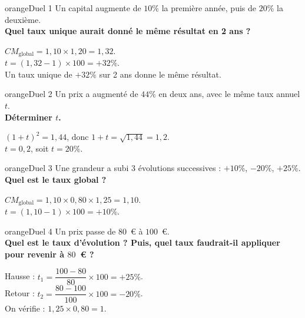 \documentclass[12pt,a4paper]{article}
\begin{document}
\vspace{0.3cm}

\begin{carte}{orange}{Duel 1}
Un capital augmente de \(10\%\) la première année, puis de \(20\%\) la deuxième.\\[0.2cm]
\textbf{Quel taux unique aurait donné le même résultat en 2 ans ?}
\end{carte}
\begin{corrige}
\(CM_{\text{global}} = 1{,}10 \times 1{,}20 = 1{,}32\).\\[0.2cm]
\(t = (1{,}32 - 1) \times 100 = +32\%\).\\[0.2cm]
Un taux unique de \(+32\%\) sur 2 ans donne le même résultat.
\end{corrige}

\begin{carte}{orange}{Duel 2}
Un prix a augmenté de \(44\%\) en deux ans, avec le même taux annuel \(t\).\\[0.2cm]
\textbf{Déterminer \(t\).}
\end{carte}
\begin{corrige}
\((1+t)^2 = 1{,}44\), donc \(1+t = \sqrt{1{,}44} = 1{,}2\).\\[0.2cm]
\(t = 0{,}2\), soit \(\boxed{t = 20\%}\).
\end{corrige}

\begin{carte}{orange}{Duel 3}
Une grandeur a subi 3 évolutions successives : \(+10\%\), \(-20\%\), \(+25\%\).\\[0.2cm]
\textbf{Quel est le taux global ?}
\end{carte}
\begin{corrige}
\(CM_{\text{global}} = 1{,}10 \times 0{,}80 \times 1{,}25 = 1{,}10\).\\[0.2cm]
\(t = (1{,}10 - 1) \times 100 = +10\%\).
\end{corrige}

\begin{carte}{orange}{Duel 4}
Un prix passe de \(80\)~\euro{} à \(100\)~\euro{}.\\[0.2cm]
\textbf{Quel est le taux d'évolution ? Puis, quel taux faudrait-il appliquer pour revenir à \(80\)~\euro{} ?}
\end{carte}
\begin{corrige}
Hausse : \(t_1 = \dfrac{100-80}{80} \times 100 = +25\%\).\\[0.2cm]
Retour : \(t_2 = \dfrac{80-100}{100} \times 100 = -20\%\).\\[0.2cm]
On vérifie : \(1{,}25 \times 0{,}80 = 1\).
\end{corrige}
\end{document}
